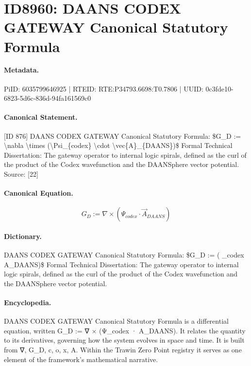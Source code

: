 \section*{ID8960: DAANS CODEX GATEWAY Canonical Statutory Formula}
\paragraph{Metadata.}
PiID: 6035799646925 | RTEID: RTE:P34793.6698:T0.7806 | UUID: 0c3fde10-6823-5d6c-836d-94fa161569c0

\paragraph{Canonical Statement.}
[ID 876] DAANS CODEX GATEWAY Canonical Statutory Formula: \$G\_D := \textbackslash{}nabla \textbackslash{}times (\textbackslash{}Psi\_\{codex\} \textbackslash{}cdot \textbackslash{}vec\{A\}\_\{DAANS\})\$ Formal Technical Dissertation: The gateway operator to internal logic spirals, defined as the curl of the product of the Codex wavefunction and the DAANSphere vector potential. Source: [22]

\paragraph{Canonical Equation.}
\[
G_D := \nabla \times (\Psi_{codex} \cdot \vec{A}_{DAANS})
\]

\paragraph{Dictionary.}
DAANS CODEX GATEWAY Canonical Statutory Formula: \$G\_D := ( \_codex A\_DAANS)\$ Formal Technical Dissertation: The gateway operator to internal logic spirals, defined as the curl of the product of the Codex wavefunction and the DAANSphere vector potential.

\paragraph{Encyclopedia.}
DAANS CODEX GATEWAY Canonical Statutory Formula is a differential equation, written G\_D := ∇ × (Ψ\_codex · A\_DAANS). It relates the quantity to its derivatives, governing how the system evolves in space and time. It is built from ∇, G\_D, c, o, x, A. Within the Trawin Zero Point registry it serves as one element of the framework's mathematical narrative.
